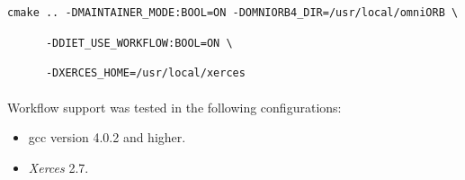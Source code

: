 \verb|cmake .. -DMAINTAINER_MODE:BOOL=ON -DOMNIORB4_DIR=/usr/local/omniORB \|

\verb|      -DDIET_USE_WORKFLOW:BOOL=ON \|

\verb|      -DXERCES_HOME=/usr/local/xerces|


\paragraph{}
Workflow support was tested in the following configurations:

\begin{itemize}
\item gcc version 4.0.2 and higher.
\item \textit{Xerces} 2.7.
\end{itemize}

%
%
%
%
%
%
%
%
